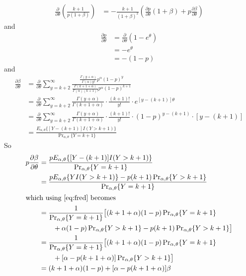 \documentclass[11pt]{article}
\newcommand{\Prsub}[1]{\Pr\nolimits_{#1}}
\begin{document}
\begin{align*}
   \frac{\partial}{\partial \theta}
   \left(
   \frac{k + 1}{p (1 + \beta)}
   \right)
   & =
   -
   \frac{k + 1}{(1 + \beta)^2}
   \left(
   \frac{\partial p}{\partial \theta} (1 + \beta)
   +
   p \frac{\partial \beta}{\partial \theta}
   \right)
\end{align*}
and
\begin{align*}
   \frac{\partial p}{\partial \theta}
   & =
   \frac{\partial}{\partial \theta}
   (1 - e^\theta)
   \\
   & =
   - e^\theta
   \\
   & =
   - (1 - p)
\end{align*}
and
\begin{align*}
   \frac{\partial \beta}{\partial \theta}
   & =
   \frac{\partial}{\partial \theta}
   \sum_{y = k + 2}^\infty
   \frac{
   \frac{\Gamma(y + \alpha)}{\Gamma(\alpha) y!} p^\alpha (1 - p)^y
   }{
   \frac{\Gamma(k + 1 + \alpha)}{\Gamma(\alpha) (k + 1)!}
   p^\alpha (1 - p)^{k + 1}
   }
   \\
   & =
   \frac{\partial}{\partial \theta}
   \sum_{y = k + 2}^\infty
   \frac{\Gamma(y + \alpha)}{\Gamma(k + 1 + \alpha)}
   \cdot
   \frac{(k + 1)!}{y!}
   \cdot
   e^{[y - (k + 1)] \theta}
   \\
   & =
   \frac{\partial}{\partial \theta}
   \sum_{y = k + 2}^\infty
   \frac{\Gamma(y + \alpha)}{\Gamma(k + 1 + \alpha)}
   \cdot
   \frac{(k + 1)!}{y!}
   \cdot
   (1 - p)^{y - (k + 1)}
   \cdot
   [y - (k + 1)]
   \\
   & =
   \frac{E_{\alpha, \theta}\{[Y - (k + 1)] I(Y > k + 1)\}}
   {\Prsub{\alpha, \theta} \{Y = k + 1\}}
\end{align*}
So
\begin{align*}
   p \frac{\partial \beta}{\partial \theta}
   & =
   \frac{p E_{\alpha, \theta}\{[Y - (k + 1)] I(Y > k + 1)\}}
   {\Prsub{\alpha, \theta} \{Y = k + 1\}}
   \\
   & =
   \frac{p E_{\alpha, \theta}\{Y I(Y > k + 1)\}
   - p (k + 1) \Prsub{\alpha, \theta} \{Y > k + 1\}}
   {\Prsub{\alpha, \theta} \{Y = k + 1\}}
   \\
\intertext{which using \eqref{eq:fred} becomes}
   & =
   \frac{1}{\Prsub{\alpha, \theta} \{Y = k + 1\}} \bigl[
   (k + 1 + \alpha) (1 - p) \Prsub{\alpha, \theta}  \{ Y = k + 1 \}
   \\
   & \qquad
   +
   \alpha (1 - p) \Prsub{\alpha, \theta}  \{ Y > k + 1 \}
   - p (k + 1) \Prsub{\alpha, \theta} \{Y > k + 1\} \bigr]
   \\
   & =
   \frac{1}{\Prsub{\alpha, \theta} \{Y = k + 1\}} \bigl[
   (k + 1 + \alpha) (1 - p) \Prsub{\alpha, \theta}  \{ Y = k + 1 \}
   \\
   & \qquad
   +
   [ \alpha - p (k + 1 + \alpha) ] \Prsub{\alpha, \theta}  \{ Y > k + 1 \}
   \bigr]
   \\
   & =
   (k + 1 + \alpha) (1 - p) +
   [ \alpha - p (k + 1 + \alpha) ]
   \beta
\end{align*}
\end{document}
